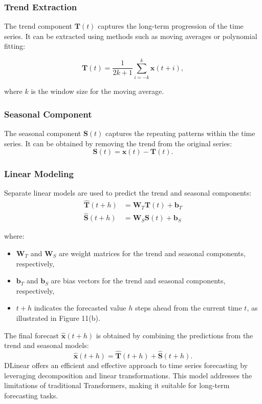 \documentclass{ieeeojies}
\begin{document}
\subsubsection{Trend Extraction}
The trend component $\mathbf{T}(t)$ captures the long-term progression of the time series. It can be extracted using methods such as moving averages or polynomial fitting:

\begin{equation}
    \mathbf{T}(t) = \frac{1}{2k+1} \sum_{i=-k}^{k} \mathbf{x}(t+i),
\end{equation}

where $k$ is the window size for the moving average.

\subsubsection{Seasonal Component}
The seasonal component $\mathbf{S}(t)$ captures the repeating patterns within the time series. It can be obtained by removing the trend from the original series:
\begin{equation}
    \mathbf{S}(t) = \mathbf{x}(t) - \mathbf{T}(t).
\end{equation}

\subsubsection{Linear Modeling}
Separate linear models are used to predict the trend and seasonal components:
\begin{align}
    \hat{\mathbf{T}}(t+h) & = \mathbf{W}_T \mathbf{T}(t) + \mathbf{b}_T \\
    \hat{\mathbf{S}}(t+h) & = \mathbf{W}_S \mathbf{S}(t) + \mathbf{b}_S
\end{align}

where:
\begin{itemize}
    \item $\mathbf{W}_T$ and $\mathbf{W}_S$ are weight matrices for the trend and seasonal components, respectively,
    \item $\mathbf{b}_T$ and $\mathbf{b}_S$ are bias vectors for the trend and seasonal components, respectively,
    \item $t+h$ indicates the forecasted value $h$ steps ahead from the current time $t$, as illustrated in Figure 11(b).
\end{itemize}

The final forecast \( \hat{\mathbf{x}}(t+h) \) is obtained by combining the predictions from the trend and seasonal models:
\begin{equation}
    \hat{\mathbf{x}}(t+h) = \hat{\mathbf{T}}(t+h) + \hat{\mathbf{S}}(t+h).
\end{equation}
DLinear offers an efficient and effective approach to time series forecasting by leveraging decomposition and linear transformations. This model addresses the limitations of traditional Transformers, making it suitable for long-term forecasting tasks.
\end{document}
